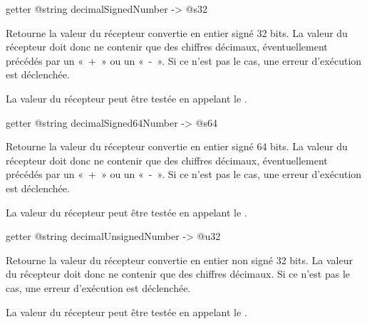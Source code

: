 
\begin{galgas4box}
getter @string decimalSignedNumber -> @s32
\end{galgas4box}

Retourne la valeur du récepteur convertie en entier signé 32 bits. La valeur du récepteur doit donc ne contenir que des chiffres décimaux, éventuellement précédés par un «~+~» ou un «~-~». Si ce n'est pas le cas, une erreur d'exécution est déclenchée.

La valeur du récepteur peut être testée en appelant le .








\begin{galgas4box}
getter @string decimalSigned64Number -> @s64
\end{galgas4box}

Retourne la valeur du récepteur convertie en entier signé 64 bits. La valeur du récepteur doit donc ne contenir que des chiffres décimaux, éventuellement précédés par un «~+~» ou un «~-~». Si ce n'est pas le cas, une erreur d'exécution est déclenchée.

La valeur du récepteur peut être testée en appelant le .








\begin{galgas4box}
getter @string decimalUnsignedNumber -> @u32
\end{galgas4box}

Retourne la valeur du récepteur convertie en entier non signé 32 bits. La valeur du récepteur doit donc ne contenir que des chiffres décimaux. Si ce n'est pas le cas, une erreur d'exécution est déclenchée.

La valeur du récepteur peut être testée en appelant le .








